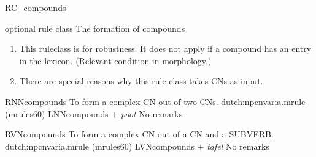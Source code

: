 \begin{mruleclass}{RC\_compounds}
\begin{classdescr}
\kind optional rule class
\classtask The formation of compounds 
\classremarks

\begin{enumerate}
  \item 

This ruleclass is for robustness. 
It does not apply if a compound has an entry
in the lexicon.  (Relevant condition in morphology.)
\item 
There are special reasons why this rule class takes CNs as input.
\end{enumerate}
\nofilters
\nospeedrules
\noplannedrules
\norulesnotince
\begin{comments}
\end{comments}

\end{classdescr}

\begin{members}

\begin{member}
 RNNcompounds
 To form a complex CN out of two CNs.
\file dutch:npcnvaria.mrule (mrules60)
\semantics LNNcompounds
 + {\em poot} 
\remarks No remarks
\end{member}

\begin{member}
 RVNcompounds
 To form a complex CN out of a CN and a SUBVERB.
\file dutch:npcnvaria.mrule (mrules60)
\semantics LVNcompounds
 + {\em tafel} 
\remarks No remarks
\end{member}
\end{members}   
\end{mruleclass}


